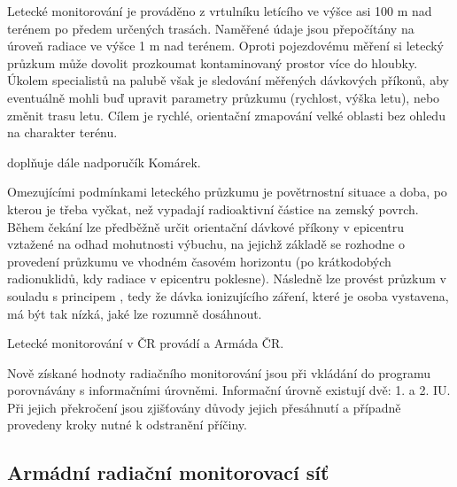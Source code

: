 \begin{itemize}
  Letecké monitorování je prováděno z vrtulníku letícího ve výšce asi
  100 m nad terénem po předem určených trasách. Naměřené údaje jsou
  přepočítány na úroveň radiace ve výšce 1 m nad terénem. Oproti
  pojezdovému měření si letecký průzkum může dovolit prozkoumat
  kontaminovaný prostor více do hloubky. Úkolem specialistů na palubě
  však je sledování měřených dávkových příkonů, aby eventuálně mohli
  buď upravit parametry průzkumu (rychlost, výška letu), nebo změnit
  trasu letu. Cílem je rychlé, orientační zmapování velké oblasti bez
  ohledu na charakter terénu.
	
   doplňuje dále nadporučík
  Komárek.
	
  Omezujícími podmínkami leteckého průzkumu je povětrnostní situace a
  doba, po kterou je třeba vyčkat, než vypadají radioaktivní částice
  na zemský povrch. Během čekání lze předběžně určit orientační
  dávkové příkony v epicentru vztažené na odhad mohutnosti výbuchu, na
  jejichž základě se rozhodne o provedení průzkumu ve vhodném časovém
  horizontu (po  krátkodobých radionuklidů, kdy radiace v
  epicentru poklesne). Následně lze provést průzkum v souladu s
  principem , tedy že dávka ionizujícího záření, které je
  osoba vystavena, má být tak nízká, jaké lze rozumně dosáhnout.
	
  Letecké monitorování v ČR provádí  a Armáda ČR.

\end{itemize}
	
Nově získané hodnoty radiačního monitorování jsou při vkládání do
programu  porovnávány s informačními úrovněmi. Informační
úrovně existují dvě: 1. a 2. IU. Při jejich překročení jsou zjišťovány
důvody jejich přesáhnutí a případně provedeny kroky nutné k odstranění
příčiny.
	
\subsection{Armádní radiační monitorovací síť}	
	
	
